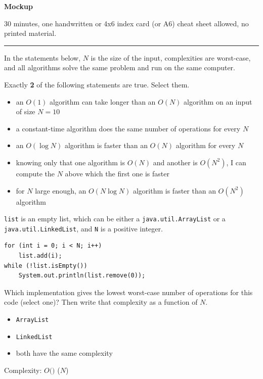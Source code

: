 {\Large\bfseries Mockup\par}
\bigskip

\fullname

30 minutes, one handwritten or 4x6 index card (or A6) cheat sheet allowed, no printed material.

\bigskip
\begin{center}\rule{0.4\linewidth}{0.4pt}\end{center}
\bigskip

\begin{question}
In the statements below, $N$ is the size of the input, complexities are worst-case, and all algorithms solve the same problem and run on the same computer.

Exactly \textbf{2} of the following statements are true. Select them.
\begin{itemize}[leftmargin=2em,itemsep=1pt,topsep=2pt]
\item[\cb{1}] an $O(1)$ algorithm can take longer than an $O(N)$ algorithm on an input of size $N = 10$
\item[\cb{0}] a constant-time algorithm does the same number of operations for every $N$
\item[\cb{0}] an $O(\log N)$ algorithm is faster than an $O(N)$ algorithm for every $N$
\item[\cb{0}] knowing only that one algorithm is $O(N)$ and another is $O(N^2)$, I can compute the $N$ above which the first one is faster
\item[\cb{1}] for $N$ large enough, an $O(N \log N)$ algorithm is faster than an $O(N^2)$ algorithm
\end{itemize}
\end{question}

\begin{question}
\lstinline|list| is an empty list, which can be either a \lstinline|java.util.ArrayList| or a \lstinline|java.util.LinkedList|, and \lstinline|N| is a positive integer.

\begin{lstlisting}
for (int i = 0; i < N; i++)
    list.add(i);
while (!list.isEmpty())
    System.out.println(list.remove(0));
\end{lstlisting}

Which implementation gives the lowest worst-case number of operations for this code (select one)? Then write that complexity as a function of $N$.

\begin{itemize}[leftmargin=2em,itemsep=1pt,topsep=2pt]
\item[\cb{0}] \lstinline|ArrayList|
\item[\cb{1}] \lstinline|LinkedList|
\item[\cb{0}] both have the same complexity
\end{itemize}

Complexity: $O($\underline{\hspace{1in}}$)$ \ifanswers ($N$)\fi
\end{question}

